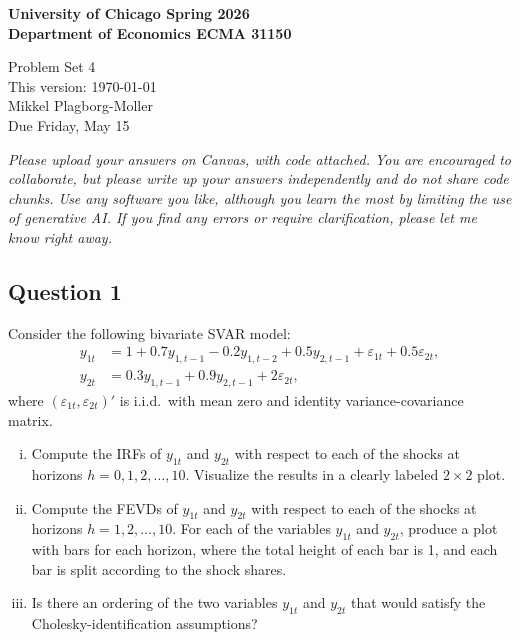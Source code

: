 \documentclass[12pt]{article}
\theoremstyle{plain}
\begin{document}
{\noindent \bf University of Chicago \hfill
Spring 2026 \\
Department of Economics \hfill ECMA 31150}

\begin{center}
{\Large Problem Set 4} \\
This version: \today \\[1ex]
Mikkel Plagborg-Moller \\
\vspace{0.5\baselineskip}
Due Friday, May 15
\end{center}
\vspace{0.2\baselineskip}

\noindent \emph{Please upload your answers on Canvas, with code attached. You are encouraged to collaborate, but please write up your answers independently and do not share code chunks. Use any software you like, although you learn the most by limiting the use of generative AI. If you find any errors or require clarification, please let me know right away.}

\subsection*{Question 1}
Consider the following bivariate SVAR model:
\begin{align*}
y_{1t} &= 1 + 0.7 y_{1,t-1} - 0.2y_{1,t-2} + 0.5 y_{2,t-1} + \varepsilon_{1t} + 0.5\varepsilon_{2t}, \\
y_{2t} &= 0.3 y_{1,t-1} + 0.9 y_{2,t-1} + 2\varepsilon_{2t},
\end{align*}
where $(\varepsilon_{1t},\varepsilon_{2t})'$ is i.i.d.\ with mean zero and identity variance-covariance matrix.

\begin{enumerate}[i)]
\item Compute the IRFs of $y_{1t}$ and $y_{2t}$ with respect to each of the shocks at horizons $h=0,1,2,\dots,10$. Visualize the results in a clearly labeled $2 \times 2$ plot.
\item Compute the FEVDs of $y_{1t}$ and $y_{2t}$ with respect to each of the shocks at horizons $h=1,2,\dots,10$. For each of the variables $y_{1t}$ and $y_{2t}$, produce a plot with bars for each horizon, where the total height of each bar is 1, and each bar is split according to the shock shares.
\item Is there an ordering of the two variables $y_{1t}$ and $y_{2t}$ that would satisfy the Cholesky-identification assumptions?
\end{enumerate}
\end{document}

